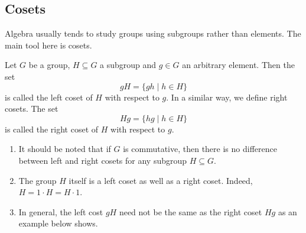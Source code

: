 \subsection{Cosets}

Algebra usually tends to study groups using subgroups rather than elements.
The main tool here is cosets.

\begin{definition}
Let $G$ be a group, $H\subseteq G$ a subgroup and $g\in G$ an arbitrary element.
Then the set
\[
gH = \{gh\mid h\in H\}
\]
is called the left coset of $H$ with respect to $g$.
In a similar way, we define right cosets.
The set
\[
Hg = \{hg\mid h\in H\}
\]
is called the right coset of $H$ with respect to $g$.
\end{definition}

\begin{remarks}
\begin{enumerate}
\item It should be noted that if $G$ is commutative, then there is no difference between left and right cosets for any subgroup $H\subseteq G$.

\item The group $H$ itself is a left coset as well as a right coset.
Indeed, $H = 1 \cdot H = H \cdot 1$.

\item In general, the left cost $gH$ need not be the same as the right coset $Hg$ as an example below shows.
\end{enumerate}
\end{remarks}



